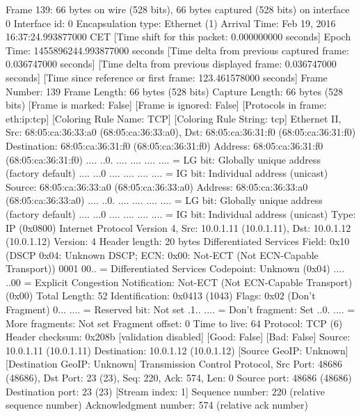 Frame 139: 66 bytes on wire (528 bits), 66 bytes captured (528 bits) on interface 0
    Interface id: 0
    Encapsulation type: Ethernet (1)
    Arrival Time: Feb 19, 2016 16:37:24.993877000 CET
    [Time shift for this packet: 0.000000000 seconds]
    Epoch Time: 1455896244.993877000 seconds
    [Time delta from previous captured frame: 0.036747000 seconds]
    [Time delta from previous displayed frame: 0.036747000 seconds]
    [Time since reference or first frame: 123.461578000 seconds]
    Frame Number: 139
    Frame Length: 66 bytes (528 bits)
    Capture Length: 66 bytes (528 bits)
    [Frame is marked: False]
    [Frame is ignored: False]
    [Protocols in frame: eth:ip:tcp]
    [Coloring Rule Name: TCP]
    [Coloring Rule String: tcp]
Ethernet II, Src: 68:05:ca:36:33:a0 (68:05:ca:36:33:a0), Dst: 68:05:ca:36:31:f0 (68:05:ca:36:31:f0)
    Destination: 68:05:ca:36:31:f0 (68:05:ca:36:31:f0)
        Address: 68:05:ca:36:31:f0 (68:05:ca:36:31:f0)
        .... ..0. .... .... .... .... = LG bit: Globally unique address (factory default)
        .... ...0 .... .... .... .... = IG bit: Individual address (unicast)
    Source: 68:05:ca:36:33:a0 (68:05:ca:36:33:a0)
        Address: 68:05:ca:36:33:a0 (68:05:ca:36:33:a0)
        .... ..0. .... .... .... .... = LG bit: Globally unique address (factory default)
        .... ...0 .... .... .... .... = IG bit: Individual address (unicast)
    Type: IP (0x0800)
Internet Protocol Version 4, Src: 10.0.1.11 (10.0.1.11), Dst: 10.0.1.12 (10.0.1.12)
    Version: 4
    Header length: 20 bytes
    Differentiated Services Field: 0x10 (DSCP 0x04: Unknown DSCP; ECN: 0x00: Not-ECT (Not ECN-Capable Transport))
        0001 00.. = Differentiated Services Codepoint: Unknown (0x04)
        .... ..00 = Explicit Congestion Notification: Not-ECT (Not ECN-Capable Transport) (0x00)
    Total Length: 52
    Identification: 0x0413 (1043)
    Flags: 0x02 (Don't Fragment)
        0... .... = Reserved bit: Not set
        .1.. .... = Don't fragment: Set
        ..0. .... = More fragments: Not set
    Fragment offset: 0
    Time to live: 64
    Protocol: TCP (6)
    Header checksum: 0x208b [validation disabled]
        [Good: False]
        [Bad: False]
    Source: 10.0.1.11 (10.0.1.11)
    Destination: 10.0.1.12 (10.0.1.12)
    [Source GeoIP: Unknown]
    [Destination GeoIP: Unknown]
Transmission Control Protocol, Src Port: 48686 (48686), Dst Port: 23 (23), Seq: 220, Ack: 574, Len: 0
    Source port: 48686 (48686)
    Destination port: 23 (23)
    [Stream index: 1]
    Sequence number: 220    (relative sequence number)
    Acknowledgment number: 574    (relative ack number)
